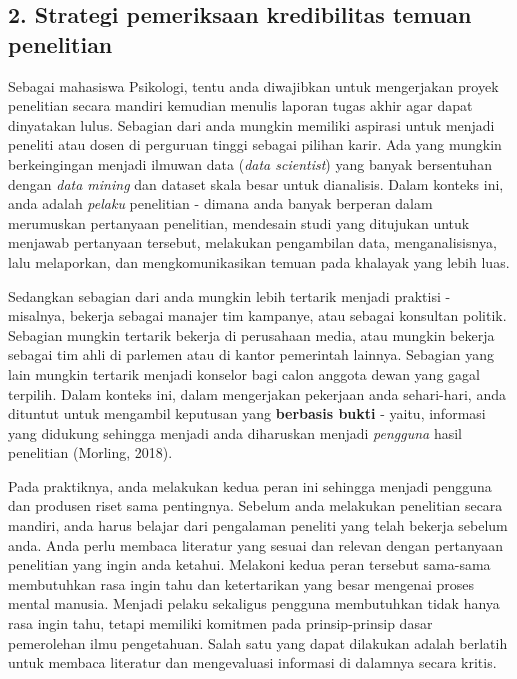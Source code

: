 \documentclass[
  english,
  man]{apa6}
\begin{document}
\hypertarget{strategi-pemeriksaan-kredibilitas-temuan-penelitian}{%
\subsection{2. Strategi pemeriksaan kredibilitas temuan penelitian}\label{strategi-pemeriksaan-kredibilitas-temuan-penelitian}}

Sebagai mahasiswa Psikologi, tentu anda diwajibkan untuk mengerjakan proyek penelitian secara mandiri kemudian menulis laporan tugas akhir agar dapat dinyatakan lulus. Sebagian dari anda mungkin memiliki aspirasi untuk menjadi peneliti atau dosen di perguruan tinggi sebagai pilihan karir. Ada yang mungkin berkeingingan menjadi ilmuwan data (\emph{data scientist}) yang banyak bersentuhan dengan \emph{data mining} dan dataset skala besar untuk dianalisis. Dalam konteks ini, anda adalah \emph{pelaku} penelitian - dimana anda banyak berperan dalam merumuskan pertanyaan penelitian, mendesain studi yang ditujukan untuk menjawab pertanyaan tersebut, melakukan pengambilan data, menganalisisnya, lalu melaporkan, dan mengkomunikasikan temuan pada khalayak yang lebih luas.

Sedangkan sebagian dari anda mungkin lebih tertarik menjadi praktisi - misalnya, bekerja sebagai manajer tim kampanye, atau sebagai konsultan politik. Sebagian mungkin tertarik bekerja di perusahaan media, atau mungkin bekerja sebagai tim ahli di parlemen atau di kantor pemerintah lainnya. Sebagian yang lain mungkin tertarik menjadi konselor bagi calon anggota dewan yang gagal terpilih. Dalam konteks ini, dalam mengerjakan pekerjaan anda sehari-hari, anda dituntut untuk mengambil keputusan yang \textbf{berbasis bukti} - yaitu, informasi yang didukung sehingga menjadi anda diharuskan menjadi \emph{pengguna} hasil penelitian (Morling, 2018).

Pada praktiknya, anda melakukan kedua peran ini sehingga menjadi pengguna dan produsen riset sama pentingnya. Sebelum anda melakukan penelitian secara mandiri, anda harus belajar dari pengalaman peneliti yang telah bekerja sebelum anda. Anda perlu membaca literatur yang sesuai dan relevan dengan pertanyaan penelitian yang ingin anda ketahui. Melakoni kedua peran tersebut sama-sama membutuhkan rasa ingin tahu dan ketertarikan yang besar mengenai proses mental manusia. Menjadi pelaku sekaligus pengguna membutuhkan tidak hanya rasa ingin tahu, tetapi memiliki komitmen pada prinsip-prinsip dasar pemerolehan ilmu pengetahuan. Salah satu yang dapat dilakukan adalah berlatih untuk membaca literatur dan mengevaluasi informasi di dalamnya secara kritis.
\end{document}
